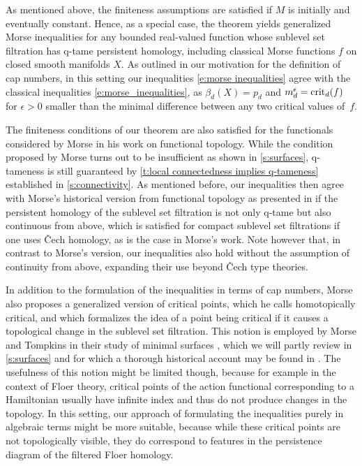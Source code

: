 As mentioned above, the finiteness assumptions are satisfied if $M$ is initially and eventually constant.
Hence, as a special case, the theorem yields generalized Morse inequalities for any bounded real-valued function whose sublevel set filtration has q-tame persistent homology, including classical Morse functions $f$ on closed smooth manifolds $X$.
As outlined in our motivation for the definition of cap numbers, in this setting our inequalities \eqref{e:morse inequalities} agree with the classical inequalities \eqref{e:morse_inequalities}, as $\beta_d(X) = p_d$ and $m_d^{\epsilon} = \operatorname{crit}_d(f)$ for $\epsilon > 0$ smaller than the minimal difference between any two critical values of~$f$.

The finiteness conditions of our theorem are also satisfied for the functionals considered by Morse in his work on functional topology.
While the condition proposed by Morse turns out to be insufficient as shown in \cref{s:surfaces}, q-tameness is still guaranteed by \cref{t:local connectedness implies q-tameness} established in \cref{s:connectivity}.
As mentioned before, our inequalities then agree with Morse's historical version from functional topology as presented in \cite{Morse.1940} if the persistent homology of the sublevel set filtration is not only q-tame but also continuous from above, which is satisfied for compact sublevel set filtrations if one uses \v{C}ech homology, as is the case in Morse's work.
Note however that, in contrast to Morse's version, our inequalities also hold without the assumption of continuity from above, expanding their use beyond \v{C}ech type theories.

\begin{rem} \label{r:homotopically critial points}
	In addition to the formulation of the inequalities in terms of cap numbers, Morse also proposes a generalized version of critical points, which he calls homotopically critical, and which formalizes the idea of a point being critical if it causes a topological change in the sublevel set filtration.
	This notion is employed by Morse and Tompkins in their study of minimal surfaces \cite{Morse.1939}, which we will partly review in \cref{s:surfaces} and for which a thorough historical account may be found in \cite[Section II.6]{Struwe.1988}.
	The usefulness of this notion might be limited though, because for example in the context of Floer theory, critical points of the action functional corresponding to a Hamiltonian usually have infinite index and thus do not produce changes in the topology.
	In this setting, our approach of formulating the inequalities purely in algebraic terms might be more suitable, because while these critical points are not topologically visible, they do correspond to features in the persistence diagram of the filtered Floer homology.
\end{rem}
